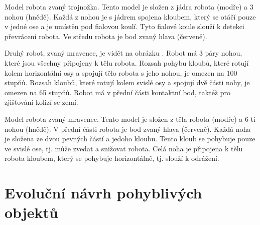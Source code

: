 Model robota zvaný trojnožka.
Tento model je složen z jádra robota (modře) a 3 nohou (hnědě).
Každá z nohou je s jádrem spojena kloubem, který se otáčí pouze v jedné ose a je umístěn pod fialovou koulí.
Tyto fialové koule slouží k detekci převrácení robota.
Ve středu robota je bod zvaný hlava (červeně).

Druhý robot, zvaný mravenec, je vidět na obrázku .
Robot má 3 páry nohou, které jsou všechny připojeny k tělu robota.
Rozsah pohybu kloubů, které rotují kolem horizontální osy a spojují tělo robota s jeho nohou, je omezen na 100 stupňů.
Rozsah kloubů, které rotují kolem svislé osy a spojují dvě části nohy, je omezen na 65 stupňů.
Robot má v přední části kontaktní bod, taktéž pro zjišťování kolizí se zemí.

Model robota zvaný mravenec.
Tento model je složen z těla robota (modře) a 6-ti nohou (hnědě).
V přední části robota je bod zvaný hlava (červeně).
Každá noha je složena ze dvou pevných částí a jedoho kloubu.
Tento kloub se pohybuje pouze ve svislé ose, tj. může zvedat a snižovat robota.
Celá noha je připojena k tělu robota kloubem, který se pohybuje horizontálně, tj. slouží k odrážení.


\chapter{Evoluční návrh pohyblivých objektů}




